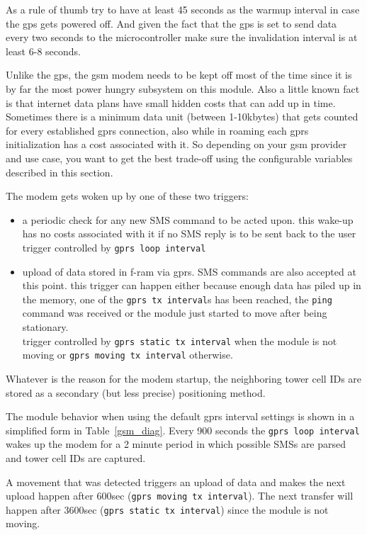 \documentclass[a4paper,twoside]{refart}
\begin{document}
As a rule of thumb try to have at least 45 seconds as the warmup interval in case the gps gets powered off.
And given the fact that the gps is set to send data every two seconds to the microcontroller make sure the invalidation interval is at least 6-8 seconds.

Unlike the gps, the gsm modem needs to be kept off most of the time since it is by far the most power hungry subsystem on this module.
Also a little known fact is that internet data plans have small hidden costs that can add up in time. Sometimes there is a minimum data unit (between 1-10kbytes) that gets counted for every established gprs connection, also while in roaming each gprs initialization has a cost associated with it.
So depending on your gsm provider and use case, you want to get the best trade-off using the configurable variables described in this section.

The modem gets woken up by one of these two triggers:

\begin{itemize}
    \item a periodic check for any new SMS command to be acted upon. this wake-up has no costs associated with it if no SMS reply is to be sent back to the user \\ trigger controlled by \verb"gprs loop interval"
    \item upload of data stored in \gls{f-ram} via gprs. SMS commands are also accepted at this point. this trigger can happen either because enough data has piled up in the memory, one of the \verb"gprs tx interval"s has been reached, the \verb"ping" command was received or the module just started to move after being stationary. \\ trigger controlled by \verb"gprs static tx interval" when the module is not moving or \verb"gprs moving tx interval" otherwise.
\end{itemize}

Whatever is the reason for the modem startup, the neighboring tower cell IDs are stored as a secondary (but less precise) positioning method. 

The module behavior when using the default gprs interval settings is shown in a simplified form in Table~\ref{gsm_diag}. Every 900 seconds the \verb"gprs loop interval" wakes up the modem for a 2 minute period in which possible SMSs are parsed and tower cell IDs are captured.

A movement that was detected triggers an upload of data and makes the next upload happen after 600sec (\verb"gprs moving tx interval"). The next transfer will happen after 3600sec (\verb"gprs static tx interval") since the module is not moving.
\end{document}
